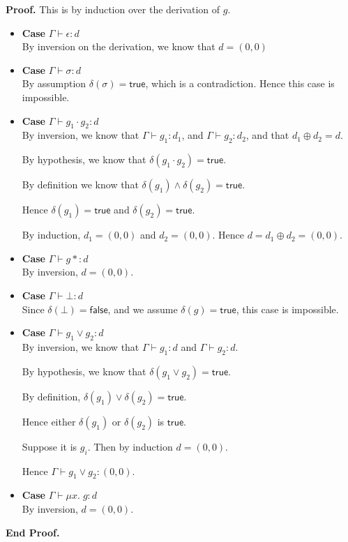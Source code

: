 \documentclass{article}
\newcommand{\fix}[2]{\mu {#1}.\;{#2}}
\newcommand{\judgebalance}[3][\Gamma]{{#1} \vdash {#2} : {#3}}
\newcommand{\combine}[2]{{#1} \oplus {#2}}
\newcommand{\true}{\mathsf{true}}
\newcommand{\false}{\mathsf{false}}
\newcommand{\zero}{(0,0)}
\newcommand{\emptify}[1]{\delta({#1})}
\newenvironment{proof}{\noindent\textbf{Proof.}}{\noindent\textbf{End Proof.}}
\newenvironment{caseblock}{\begin{itemize}}{\end{itemize}}
\newenvironment{case}[1]{\item \textbf{Case} {#1}\\}{}
\begin{document}
\begin{proof}
  This is by induction over the derivation of $g$. 
  \begin{caseblock}
    \begin{case}{$\judgebalance{\epsilon}{d}$}
      By inversion on the derivation, we know that $d = \zero$
    \end{case}

    \begin{case}{$\judgebalance{\sigma}{d}$}
      By assumption $\emptify{\sigma} = \true$, which is a contradiction. Hence this
      case is impossible. 
    \end{case}

    \begin{case}{$\judgebalance{g_1\cdot g_2}{d}$}
      By inversion, we know that $\judgebalance{g_1}{d_1}$, and
      $\judgebalance{g_2}{d_2}$, and that $\combine{d_1}{d_2} = d$.  

      By hypothesis, we know that $\emptify{g_1\cdot g_2} = \true$. 

      By definition we know that $\emptify{g_1} \land \emptify{g_2} =
      \true$. 

      Hence $\emptify{g_1} = \true$ and $\emptify{g_2} = \true$.

      By induction, $d_1 = \zero$ and $d_2 = \zero$. Hence $d = \combine{d_1}{d_2} = \zero$. 
    \end{case}

    \begin{case}{$\judgebalance{g*}{d}$}
      By inversion, $d = \zero$. 
    \end{case}

    \begin{case}{$\judgebalance{\bot}{d}$}
      Since $\emptify{\bot} = \false$, and we assume $\emptify{g} = \true$, this case is
      impossible. 
    \end{case}

    \begin{case}{$\judgebalance{g_1 \vee g_2}{d}$}
      By inversion, we know that $\judgebalance{g_1}{d}$ and $\judgebalance{g_2}{d}$. 
      
      By hypothesis, we know that $\emptify{g_1 \vee g_2} = \true$. 

      By definition, $\emptify{g_1} \vee \emptify{g_2} = \true$. 
      
      Hence either $\emptify{g_1}$ or $\emptify{g_2}$ is $\true$. 

      Suppose it is $g_i$. Then by induction $d = \zero$. 

      Hence $\judgebalance{g_1 \vee g_2}{\zero}$. 
    \end{case}

    \begin{case}{$\judgebalance{\fix{x}{g}}{d}$}
      By inversion, $d = \zero$. 
    \end{case}
  \end{caseblock}
\end{proof}
\end{document}
